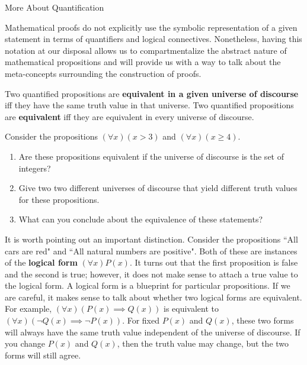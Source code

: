 \begin{section}{More About Quantification}

Mathematical proofs do not explicitly use the symbolic representation of a given statement in terms of quantifiers and logical connectives.  Nonetheless, having this notation at our disposal allows us to compartmentalize the abstract nature of mathematical propositions and will provide us with a way to talk about the meta-concepts surrounding the construction of proofs.

\begin{definition}
Two quantified propositions are \textbf{equivalent in a given universe of discourse} iff they have the same truth value in that universe.  Two quantified propositions are \textbf{equivalent} iff they are equivalent in every universe of discourse.
\end{definition}

\begin{exercise}
Consider the propositions $(\forall x)(x>3)$ and $(\forall x)(x\geq 4)$.  
\begin{enumerate}[label=\textrm{(\alph*)}]
\item Are these propositions equivalent if the universe of discourse is the set of integers?
\item Give two two different universes of discourse that yield different truth values for these propositions.  
\item What can you conclude about the equivalence of these statements?
\end{enumerate}
\end{exercise}

It is worth pointing out an important distinction.  Consider the propositions ``All cars are red" and ``All natural numbers are positive".  Both of these are instances of the \textbf{logical form} $(\forall x)P(x)$.  It turns out that the first proposition is false and the second is true; however, it does not make sense to attach a true value to the logical form.  A logical form is a blueprint for particular propositions.  If we are careful, it makes sense to talk about whether two logical forms are equivalent.  For example, $(\forall x)(P(x)\implies Q(x))$ is equivalent to $(\forall x)(\neg Q(x)\implies \neg P(x))$.  For fixed $P(x)$ and $Q(x)$, these two forms will always have the same truth value independent of the universe of discourse.  If you change $P(x)$ and $Q(x)$, then the truth value may change, but the two forms will still agree.


\end{section}
